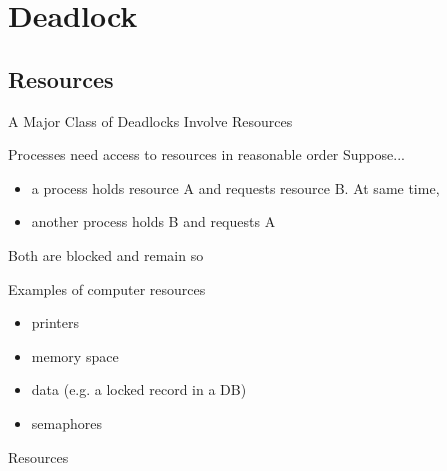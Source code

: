 \begin{frame}
  \begin{refsection}
    \nocite{wiki:sched} \printbibliography[heading=none]
  \end{refsection}
\end{frame}


\section{Deadlock}
\label{sec:deadlock}

\subsection{Resources}
\label{sec:resources}

\begin{frame}{A Major Class of Deadlocks Involve Resources}
  \begin{block}{Processes need access to resources in reasonable order}
    Suppose...
    \begin{itemize}
    \item a process holds resource A and requests resource B. At same time,
    \item another process holds B and requests A
    \end{itemize}
    Both are blocked and remain so
  \end{block}
  \begin{block}{Examples of computer resources}
    \begin{itemize}
    \item printers
    \item memory space
    \item data (e.g. a locked record in a DB)
    \item semaphores
    \end{itemize}
  \end{block}
\end{frame}

\begin{frame}{Resources}
  \begin{center}
  \end{center}
\end{frame}

